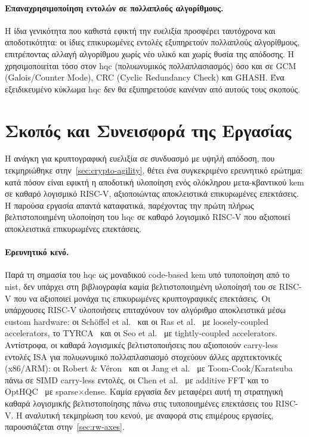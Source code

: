 \paragraph{Επαναχρησιμοποίηση εντολών σε πολλαπλούς αλγορίθμους.}
Η ίδια γενικότητα που καθιστά εφικτή την ευελιξία προσφέρει ταυτόχρονα και
αποδοτικότητα: οι ίδιες επικυρωμένες εντολές εξυπηρετούν πολλαπλούς
αλγορίθμους, επιτρέποντας αλλαγή αλγορίθμου χωρίς νέο υλικό και χωρίς θυσία της
απόδοσης. Η \clmul χρησιμοποιείται τόσο στον \gls{hqc} (πολυωνυμικός
πολλαπλασιασμός) όσο και σε GCM (Galois/Counter Mode), CRC (Cyclic Redundancy
Check) και GHASH. Ένα εξειδικευμένο κύκλωμα \gls{hqc} δεν θα εξυπηρετούσε
κανέναν από αυτούς τους σκοπούς.

\section{Σκοπός και Συνεισφορά της Εργασίας}
\label{sec:contribution}

Η ανάγκη για κρυπτογραφική ευελιξία σε συνδυασμό με υψηλή απόδοση, που
τεκμηριώθηκε στην~\cref{sec:crypto-agility}, θέτει ένα συγκεκριμένο ερευνητικό
ερώτημα: κατά πόσον είναι εφικτή η αποδοτική υλοποίηση ενός ολόκληρου
μετα-κβαντικού \gls{kem} σε καθαρό λογισμικό RISC-V, αξιοποιώντας αποκλειστικά
επικυρωμένες επεκτάσεις. Η παρούσα εργασία απαντά καταφατικά, παρέχοντας την
πρώτη πλήρως βελτιστοποιημένη υλοποίηση του \gls{hqc} σε καθαρό λογισμικό
RISC-V που αξιοποιεί αποκλειστικά επικυρωμένες επεκτάσεις.

\paragraph{Ερευνητικό κενό.}
Παρά τη σημασία του \gls{hqc} ως μοναδικού code-based \gls{kem} υπό τυποποίηση
από το \gls{nist}, δεν υπάρχει στη βιβλιογραφία καμία βελτιστοποιημένη
υλοποίησή του σε RISC-V που να αξιοποιεί μονάχα τις επικυρωμένες κρυπτογραφικές
επεκτάσεις. Οι υπάρχουσες RISC-V υλοποιήσεις επιταχύνουν τον αλγόριθμο
αποκλειστικά μέσω custom hardware: οι
Schöffel et al.~\cite{Schoeffel2022-HQC-IoT} και οι Ras
et al.~\cite{ras-nist2025} με loosely-coupled accelerators, το
TYRCA~\cite{Dolmeta2025-TYRCA} και οι Seo et al.~\cite{Seo2026-HQC-Ibex} με
tightly-coupled accelerators. Αντίστροφα, οι καθαρά λογισμικές βελτιστοποιήσεις
που αξιοποιούν carry-less εντολές ISA για πολυωνυμικό πολλαπλασιασμό στοχεύουν
άλλες αρχιτεκτονικές (x86/ARM): οι Robert \&
Véron~\cite{RobertVeron2023-avx512-gf2x} και οι Jang
et al.~\cite{Jang2026-gf2x-SIMD} με Toom-Cook/Karatsuba πάνω σε SIMD carry-less
εντολές, οι Chen et al.~\cite{Chen2026-TCHES-HQC-FFT} με additive FFT και το
OptHQC~\cite{OptHQC2025} με sparse$\times$dense. Καμία εργασία δεν μεταφέρει
αυτή τη στρατηγική καθαρά λογισμικής βελτιστοποίησης πάνω στις τυποποιημένες
επεκτάσεις του RISC-V. Η αναλυτική τεκμηρίωση του κενού, με
αναφορά στις επιμέρους εργασίες, παρουσιάζεται στην~\cref{sec:rw-axes}.

